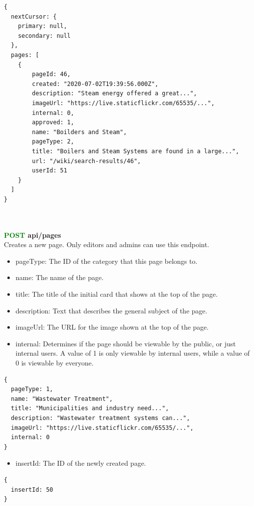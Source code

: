 \documentclass[onecolumn, draftclsnofoot,10pt, compsoc, usenames, dvipsnames]{IEEEtran}
\begin{document}
\begin{lstlisting}[caption=Example Response]
{ 
  nextCursor: {
    primary: null, 
    secondary: null
  },
  pages: [
    {
        pageId: 46,
        created: "2020-07-02T19:39:56.000Z",
        description: "Steam energy offered a great...",
        imageUrl: "https://live.staticflickr.com/65535/...",
        internal: 0,
        approved: 1,
        name: "Boilders and Steam",
        pageType: 2,
        title: "Boilers and Steam Systems are found in a large...",
        url: "/wiki/search-results/46",
        userId: 51
    }
  ]
}
\end{lstlisting}
\\~\\


\noindent
\textbf{\textcolor{Green}{POST} api/pages} \\
Creates a new page. Only editors and admins can use this endpoint.
\begin{itemize}
    \item pageType: The ID of the category that this page belongs to.
    \item name: The name of the page.
    \item title: The title of the initial card that shows at the top of the page.
    \item description: Text that describes the general subject of the page.
    \item imageUrl: The URL for the image shown at the top of the page.
    \item internal: Determines if the page should be viewable by the public, or just internal users. A value of 1 is only viewable by internal users, while a value of 0 is viewable by everyone.
\end{itemize}
\begin{lstlisting}[caption=Example Request Body]
{ 
  pageType: 1,
  name: "Wastewater Treatment",
  title: "Municipalities and industry need...",
  description: "Wastewater treatment systems can...",
  imageUrl: "https://live.staticflickr.com/65535/...",
  internal: 0
}
\end{lstlisting}
\begin{itemize}
  \item insertId: The ID of the newly created page.
\end{itemize}
\begin{lstlisting}[caption=Example Response]
{ 
  insertId: 50
}
\end{lstlisting}
\\~\\
\end{document}

